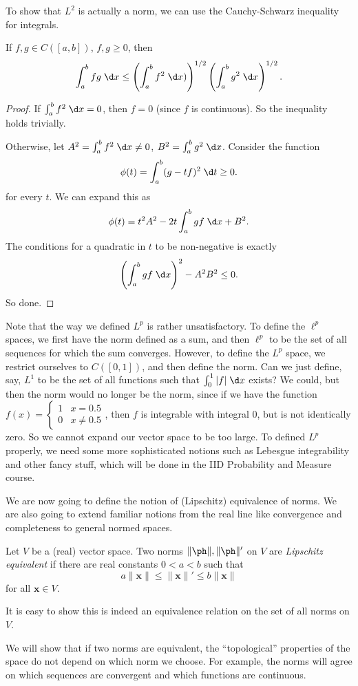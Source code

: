 \documentclass[a4paper]{article}
\begin{document}
To show that $L^2$ is actually a norm, we can use the Cauchy-Schwarz inequality for integrals.
\begin{lemma}
  If $f, g\in C([a, b])$, $f, g \geq 0$, then
  \[
    \int_a^b fg\;\d x \leq \left(\int_a^b f^2\;\d x)\right)^{1/2}\left(\int_a^b g^2\;\d x\right)^{1/2}.
  \]
\end{lemma}

\begin{proof}
  If $\int_a^b f^2\;\d x = 0$, then $f = 0$ (since $f$ is continuous). So the inequality holds trivially.

  Otherwise, let $A^2 = \int_a^b f^2\;\d x \not= 0$, $B^2 = \int_a^b g^2\;\d x$. Consider the function
  \[
    \phi(t) = \int_a^b (g - tf)^2 \;\d t \geq 0.
  \]
  for every $t$. We can expand this as
  \[
    \phi(t) = t^2 A^2 - 2t \int_a^b gf\;\d x + B^2.
  \]
  The conditions for a quadratic in $t$ to be non-negative is exactly
  \[
    \left(\int_a^b gf\;\d x\right)^2 - A^2 B^2 \leq 0.
  \]
  So done.
\end{proof}
Note that the way we defined $L^p$ is rather unsatisfactory. To define the $\ell^p$ spaces, we first have the norm defined as a sum, and then $\ell^p$ to be the set of all sequences for which the sum converges. However, to define the $L^p$ space, we restrict ourselves to $C([0, 1])$, and then define the norm. Can we just define, say, $L^1$ to be the set of all functions such that $\int_0^1 |f|\;\d x$ exists? We could, but then the norm would no longer be the norm, since if we have the function $f(x) = \begin{cases} 1 & x = 0.5\\ 0 & x \not= 0.5\end{cases}$, then $f$ is integrable with integral $0$, but is not identically zero. So we cannot expand our vector space to be too large. To defined $L^p$ properly, we need some more sophisticated notions such as Lebesgue integrability and other fancy stuff, which will be done in the IID Probability and Measure course.

We are now going to define the notion of (Lipschitz) equivalence of norms. We are also going to extend familiar notions from the real line like convergence and completeness to general normed spaces.

\begin{defi}
  Let $V$ be a (real) vector space. Two norms $\|\ph \|, \|\ph \|'$ on $V$ are \emph{Lipschitz equivalent} if there are real constants $0 < a < b$ such that
  \[
    a \|\mathbf{x}\| \leq \|\mathbf{x}\|' \leq b\|\mathbf{x}\|
  \]
  for all $\mathbf{x} \in V$.

  It is easy to show this is indeed an equivalence relation on the set of all norms on $V$.
\end{defi}
We will show that if two norms are equivalent, the ``topological'' properties of the space do not depend on which norm we choose. For example, the norms will agree on which sequences are convergent and which functions are continuous.
\end{document}
